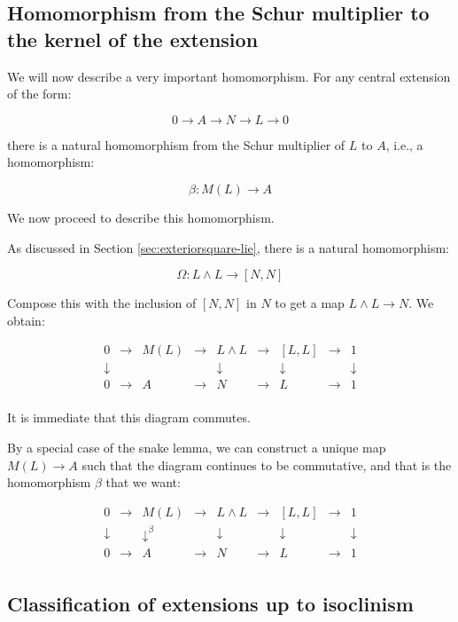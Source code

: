 \documentclass{ucetd}
\begin{document}
\subsection{Homomorphism from the Schur multiplier to the kernel of the extension}\label{sec:homschurkernel-lie}

We will now describe a very important homomorphism. For any central extension of the form:

$$0 \to A \to N \to L \to 0$$

there is a natural homomorphism from the Schur multiplier of $L$ to $A$, i.e., a homomorphism:

$$\beta: M(L) \to A$$

We now proceed to describe this homomorphism.

As discussed in Section \ref{sec:exteriorsquare-lie}, there is a natural
homomorphism:

$$\Omega: L \wedge L \to [N,N]$$

Compose this with the inclusion of $[N,N]$ in $N$ to get a map $L
\wedge L \to N$. We obtain:

$$\begin{array}{ccccccccc}
0 & \to & M(L) & \to & L \wedge L & \to & [L,L] & \to & 1\\
\downarrow &&               && \downarrow     &&\downarrow&& \downarrow\\
0 & \to & A & \to & N & \to & L & \to & 1\\
\end{array}$$

It is immediate that this diagram commutes.

By a special case of the snake lemma, we can construct a unique map
$M(L) \to A$ such that the diagram continues to be commutative, and
that is the homomorphism $\beta$ that we want:

$$\begin{array}{ccccccccc}
0 & \to & M(L) & \to & L \wedge L & \to & [L,L] & \to & 1\\
\downarrow &&   \downarrow^{\beta}  &&  \downarrow     && \downarrow&& \downarrow\\
0 & \to & A &\to & N & \to & L & \to & 1\\
\end{array}$$

\subsection{Classification of extensions up to isoclinism}\label{sec:extensionsuptoisoclinism-lie}
\end{document}
